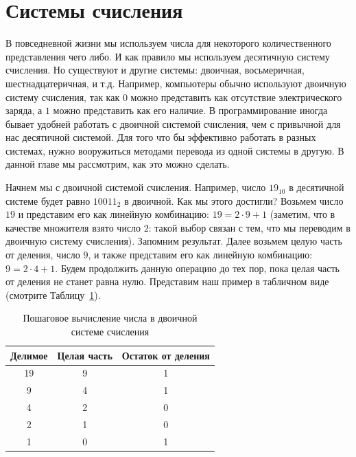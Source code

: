 \section{Системы счисления}

В повседневной жизни мы используем числа для некоторого количественного
представления чего либо. И как правило мы используем десятичную систему 
счисления. Но существуют и другие системы: двоичная, восьмеричная, 
шестнадцатеричная, и т.д. Например, компьютеры обычно используют 
двоичную систему счисления, так как $0$ можно представить как отсутствие 
электрического заряда, а $1$ можно представить как его наличие. 
В программирование иногда бывает удобней работать с двоичной системой
счисления, чем с привычной для нас десятичной системой. Для того что бы 
эффективно работать в разных системах, нужно вооружиться методами перевода
из одной системы в другую. В данной главе мы рассмотрим, как это можно сделать.

Начнем мы с двоичной системой счисления. Например, число $19_{10}$ в десятичной
системе будет равно $10011_{2}$ в двоичной. Как мы этого достигли? Возьмем число 
$19$ и представим его как линейную комбинацию: $19=2 \cdot 9 + 1$ (заметим, что в качестве 
множителя взято число $2$: такой выбор связан с тем, что мы переводим в двоичную систему 
счисления). Запомним результат. Далее возьмем целую часть от деления, 
число $9$, и также представим его как линейную комбинацию: $9=2 \cdot 4 + 1$. 
Будем продолжить данную операцию до тех пор, пока целая часть 
от деления не станет равна нулю. Представим наш пример в 
табличном виде (смотрите Таблицу~\ref{tab:binary}).

\begin{table}
\centering
\begin{tabular}{c|c|c}
\hline
Делимое & Целая часть & Остаток от деления \\\hline
\cellcolor{lightblue}19 & \cellcolor{lightblue}9 & \cellcolor{blue}1 \\
\cellcolor{lightblue}9  & \cellcolor{lightblue}4 & \cellcolor{lightblue}1 \\
\cellcolor{lightblue}4  & \cellcolor{lightblue}2 & \cellcolor{lightblue}0 \\
\cellcolor{lightblue}2  & \cellcolor{lightblue}1 & \cellcolor{lightblue}0 \\
\cellcolor{lightblue}1  & \cellcolor{lightblue}0 & \cellcolor{red}1 \\
\hline
\end{tabular}
\caption{Пошаговое вычисление числа в двоичной системе счисления}
\label{tab:binary}
\end{table}

